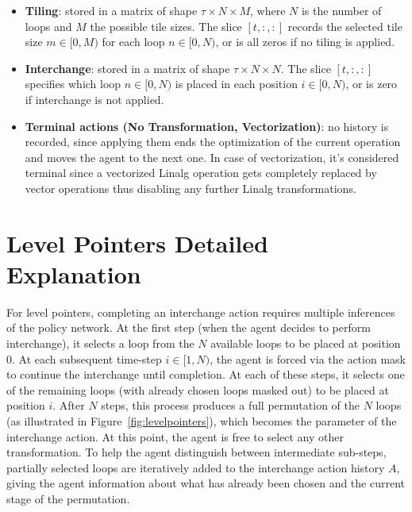 \documentclass[10pt,twocolumn]{article}
\begin{document}
\begin{itemize}
\item \textbf{Tiling}: stored in a matrix of shape $\tau \times N \times M$, where $N$ is the number of loops and $M$ the possible tile sizes. The slice $[t, :, :]$ records the selected tile size $m \in [0, M)$ for each loop $n \in [0, N)$, or is all zeros if no tiling is applied.
\item \textbf{Interchange}: stored in a matrix of shape $\tau \times N \times N$. The slice $[t, :, :]$ specifies which loop $n \in [0, N)$ is placed in each position $i \in [0, N)$, or is zero if interchange is not applied.
\item \textbf{Terminal actions (No Transformation, Vectorization)}: no history is recorded, since applying them ends the optimization of the current operation and moves the agent to the next one. In case of vectorization, it's considered terminal since a vectorized Linalg operation gets completely replaced by vector operations thus disabling any further Linalg transformations.
\end{itemize}

\section{Level Pointers Detailed Explanation}
\label{app:levelpointers}

For level pointers, completing an interchange action requires multiple inferences of the policy network. At the first step (when the agent decides to perform interchange), it selects a loop from the $N$ available loops to be placed at position 0. At each subsequent time-step $i \in [1, N)$, the agent is forced via the action mask to continue the interchange until completion. At each of these steps, it selects one of the remaining loops (with already chosen loops masked out) to be placed at position $i$. After $N$ steps, this process produces a full permutation of the $N$ loops (as illustrated in Figure~\ref{fig:levelpointers}), which becomes the parameter of the interchange action. At this point, the agent is free to select any other transformation. To help the agent distinguish between intermediate sub-steps, partially selected loops are iteratively added to the interchange action history $A$, giving the agent information about what has already been chosen and the current stage of the permutation.
\end{document}
